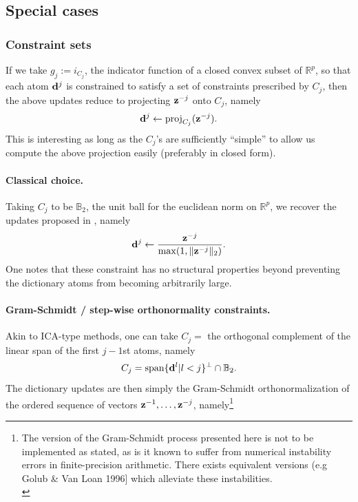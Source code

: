 \subsection{Special cases}
\subsubsection{Constraint sets}
If we take $g_j := i_{C_j}$, the indicator function of a closed convex subset of $\mathbb R^p$, so that each atom $\mathbf{d}^j$ is constrained to satisfy a set of constraints prescribed by $C_j$, then the above updates reduce to projecting $\mathbf{z}^{-j}$ onto $C_j$, namely
\begin{equation}
\mathbf{d}^j \leftarrow  \text{proj}_{C_j}(\mathbf{z}^{-j}).
\end{equation}
This is interesting as long as the $C_j$'s are sufficiently ``simple'' to allow us compute the above projection easily (preferably in closed form).
\paragraph{Classical choice.}

Taking $C_j$ to be $\mathbb B_2$, the unit ball for the euclidean norm on  $\mathbb R^p$, we recover the updates proposed in \citep{mairal2009,mairal2010}, namely
\begin{equation}
\mathbf{d}^j \leftarrow  \frac{\mathbf{z}^{-j}}{\max(1,\|\mathbf{z}^{-j}\|_2)}.
\end{equation}
One notes that these constraint has no structural properties beyond preventing the dictionary atoms from becoming arbitrarily large.

\paragraph{Gram-Schmidt / step-wise orthonormality constraints.}
Akin to ICA-type methods, one can take $C_j =$ the orthogonal complement of the linear span of the first $j-1$st atoms, namely
  \begin{equation}
    C_{j} = \text{span}\{\mathbf{d}^l | l < j\}^\perp \cap \mathbb B_{2}.
  \end{equation}
  The dictionary updates are then simply the Gram-Schmidt orthonormalization of the ordered sequence of vectors $\mathbf{z}^{-1},\ldots,\mathbf{z}^{-j}$, namely\footnote{The version of the Gram-Schmidt process presented here is not to be implemented as stated, as is it known to suffer from numerical instability errors in finite-precision arithmetic. There exists equivalent versions (e.g Golub \& Van Loan 1996] which alleviate these instabilities.\\}

